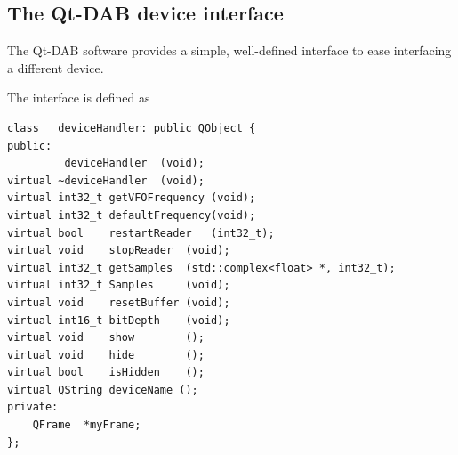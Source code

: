 \documentclass[12pt]{article}
\begin{document}
\subsection{The Qt-DAB device interface}
The Qt-DAB software provides a simple, well-defined interface
to ease interfacing a different device.
\par
The interface is defined as
{\small
\begin{verbatim}
class	deviceHandler: public QObject {
public:
         deviceHandler 	(void);
virtual	~deviceHandler 	(void);
virtual	int32_t	getVFOFrequency	(void);
virtual	int32_t	defaultFrequency(void);
virtual	bool	restartReader	(int32_t);
virtual	void	stopReader	(void);
virtual	int32_t	getSamples	(std::complex<float> *, int32_t);
virtual	int32_t	Samples		(void);
virtual	void	resetBuffer	(void);
virtual	int16_t	bitDepth	(void);
virtual	void	show		();
virtual	void	hide		();
virtual	bool	isHidden	();
virtual	QString	deviceName ();
private:
	QFrame	*myFrame;
};
\end{verbatim}
}
\end{document}
